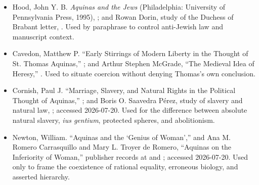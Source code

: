 \begin{itemize}
\item Hood, John Y. B.  \emph{Aquinas and the Jews} (Philadelphia: University
of Pennsylvania Press, 1995),
; and Rowan Dorin, study of the Duchess of Brabant letter,
.  Used by paraphrase to control anti-Jewish law and manuscript context.

\item Cavedon, Matthew P.  ``Early Stirrings of Modern Liberty in the Thought
of St. Thomas Aquinas,''
; and Arthur Stephen
McGrade, ``The Medieval Idea of Heresy,''
.  Used to situate coercion
without denying Thomas's own conclusion.

\item Cornish, Paul J.  ``Marriage, Slavery, and Natural Rights in the
Political Thought of Aquinas,''
; and Boris O. Saavedra
Pérez, study of slavery and natural law,
; accessed 2026-07-20.  Used for the difference between absolute
natural slavery, \emph{ius gentium}, protected spheres, and abolitionism.

\item Newton, William.  ``Aquinas and the `Genius of Woman','' and Ana M.
Romero Carrasquillo and Mary L. Troyer de Romero, ``Aquinas on the Inferiority
of Woman,'' publisher records at
 and
; accessed 2026-07-20.  Used only to frame the
coexistence of rational equality, erroneous biology, and asserted hierarchy.
\end{itemize}
